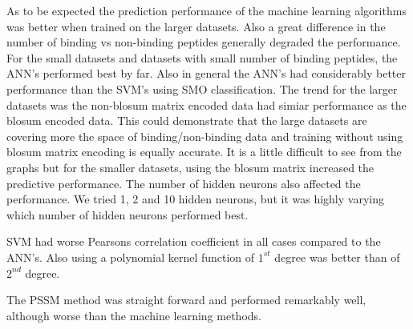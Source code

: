 As to be expected the prediction performance of the machine learning algorithms was better when trained on the larger datasets.
Also a great difference in the number of binding vs non-binding peptides generally degraded the performance.
For the small datasets and datasets with small number of binding peptides, the ANN's performed best by far.
Also in general the ANN's had considerably better performance than the SVM's using SMO classification.
The trend for the larger datasets was the non-blosum matrix encoded data had simiar performance as the blosum encoded data. 
This could demonstrate that the large datasets are covering more the space of binding/non-binding data and training without using blosum matrix encoding is equally accurate.
It is a little difficult to see from the graphs but for the smaller datasets, using the blosum matrix increased the predictive performance.
The number of hidden neurons also affected the performance. We tried 1, 2 and 10 hidden neurons, but it was highly varying which number of hidden neurons performed best.

SVM had worse Pearsons correlation coefficient in all cases compared to the ANN's. Also using a polynomial kernel function of $1^{st}$ degree was better than of $2^{nd}$ degree.

The PSSM method was straight forward and performed remarkably well, although worse than the machine learning methods.
